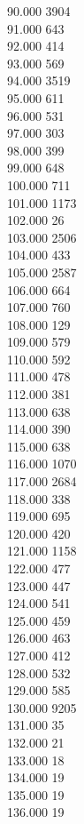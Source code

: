 { 90.000	3904 \\
 91.000	643 \\
 92.000	414 \\
 93.000	569 \\
 94.000	3519 \\
 95.000	611 \\
 96.000	531 \\
 97.000	303 \\
 98.000	399 \\
 99.000	648 \\
 100.000	711 \\
 101.000	1173 \\
 102.000	26 \\
 103.000	2506 \\
 104.000	433 \\
 105.000	2587 \\
 106.000	664 \\
 107.000	760 \\
 108.000	129 \\
 109.000	579 \\
 110.000	592 \\
 111.000	478 \\
 112.000	381 \\
 113.000	638 \\
 114.000	390 \\
 115.000	638 \\
 116.000	1070 \\
 117.000	2684 \\
 118.000	338 \\
 119.000	695 \\
 120.000	420 \\
 121.000	1158 \\
 122.000	477 \\
 123.000	447 \\
 124.000	541 \\
 125.000	459 \\
 126.000	463 \\
 127.000	412 \\
 128.000	532 \\
 129.000	585 \\
 130.000	9205 \\
 131.000	35 \\
 132.000	21 \\
 133.000	18 \\
 134.000	19 \\
 135.000	19 \\
 136.000	19 \\
}
